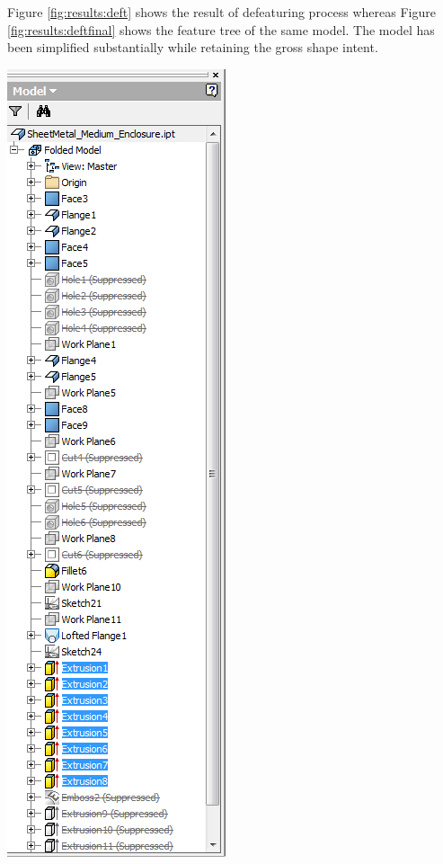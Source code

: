 \begin{minipage}{\linewidth}
\begin{minipage}[c]{0.62\linewidth}
Figure \ref{fig:results:deft} shows the result of defeaturing process whereas Figure \ref{fig:results:deftfinal} shows the feature tree of the same model. The model has been simplified substantially while retaining the gross shape intent.

\end{minipage}
\quad
\begin{minipage}[c]{0.3\linewidth}
\includegraphics[width=\linewidth,valign=t]{../Common/images/SheetMetal_Medium_Enclosure_PhaseIISelectionsTree}
 \label{fig:results:phIIsel}
\end{minipage}
\end{minipage}



